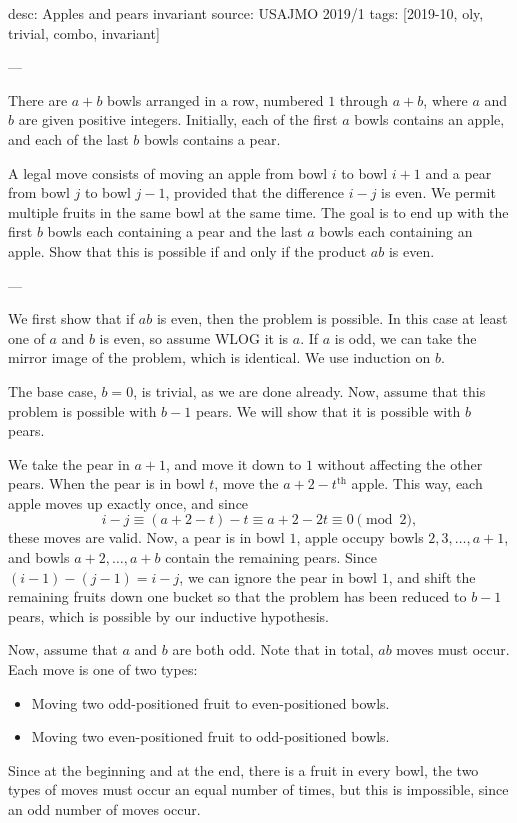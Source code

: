 desc: Apples and pears invariant
source: USAJMO 2019/1
tags: [2019-10, oly, trivial, combo, invariant]

---

There are $a+b$ bowls arranged in a row, numbered $1$ through $a+b$, where $a$ and $b$ are given positive integers. Initially, each of the first $a$ bowls contains an apple, and each of the last $b$ bowls contains a pear.

A legal move consists of moving an apple from bowl $i$ to bowl $i+1$ and a pear from bowl $j$ to bowl $j-1$, provided that the difference $i-j$ is even. We permit multiple fruits in the same bowl at the same time. The goal is to end up with the first $b$ bowls each containing a pear and the last $a$ bowls each containing an apple. Show that this is possible if and only if the product $ab$ is even.

---

We first show that if $ab$ is even, then the problem is possible. In this case at least one of $a$ and $b$ is even, so assume WLOG it is $a$. If $a$ is odd, we can take the mirror image of the problem, which is identical. We use induction on $b$.

The base case, $b=0$, is trivial, as we are done already. Now, assume that this problem is possible with $b-1$ pears. We will show that it is possible with $b$ pears.

We take the pear in $a+1$, and move it down to $1$ without affecting the other pears. When the pear is in bowl $t$, move the $a+2-t^\text{th}$ apple. This way, each apple moves up exactly once, and since \[i-j\equiv (a+2-t)-t\equiv a+2-2t\equiv 0\pmod2,\]
these moves are valid. Now, a pear is in bowl $1$, apple occupy bowls $2,3,\ldots,a+1$, and bowls $a+2,\ldots,a+b$ contain the remaining pears. Since $(i-1)-(j-1)=i-j$, we can ignore the pear in bowl $1$, and shift the remaining fruits down one bucket so that the problem has been reduced to $b-1$ pears, which is possible by our inductive hypothesis.

Now, assume that $a$ and $b$ are both odd. Note that in total, $ab$ moves must occur. Each move is one of two types:
\begin{itemize}[itemsep=0em]
    \item Moving two odd-positioned fruit to even-positioned bowls.
    \item Moving two even-positioned fruit to odd-positioned bowls.
\end{itemize}
Since at the beginning and at the end, there is a fruit in every bowl, the two types of moves must occur an equal number of times, but this is impossible, since an odd number of moves occur.
